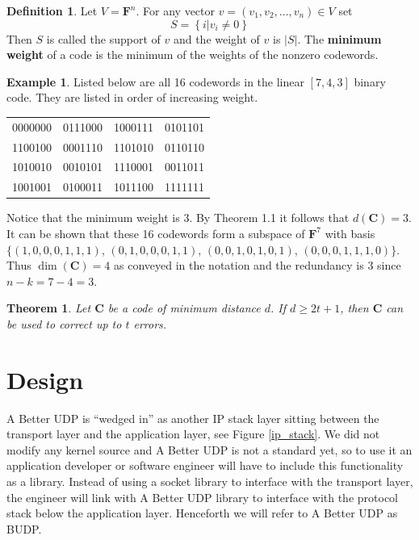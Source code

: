 \documentclass[conference]{IEEEtran}
\newtheorem{theorem}[thm]{Theorem}
\theoremstyle{definition}
\newtheorem{definition}[thm]{Definition}
\newtheorem{example}[thm]{Example}
\begin{document}
\begin{definition}
Let $V=\mathbf{F}^n$.  For any vector $v=(v_1,v_2,\ldots,v_n)\in V$
set
$$
S=\left\{i|v_i\neq 0\right\}
$$
Then $S$ is called the support of $v$ and the weight of $v$ is
$\left|S\right|$.  The {\bf minimum weight} of a code is the
minimum of the weights of the nonzero codewords.
\end{definition}


\begin{example}\label{hamming}
Listed below are all 16 codewords in the linear $[7,4,3]$
binary code.  They are listed in order of increasing weight.\\

\begin{center}
 \begin{tabular}{cccc}
  0000000 & 0111000 & 1000111 & 0101101\\
  1100100 & 0001110 & 1101010 & 0110110\\
  1010010 & 0010101 & 1110001 & 0011011\\
  1001001 & 0100011 & 1011100 & 1111111\\
 \end{tabular}
\end{center}

Notice that the minimum weight is 3.  By Theorem 1.1 it
follows that $d(\mathbf{C}) = 3$.  It can be shown
that these 16 codewords form a subspace of $\mathbf{F}^7$
with basis $\{(1,0,0,0,1,1,1)$, $(0,1,0,0,0,1,1)$, 
$(0,0,1,0,1,0,1)$, $(0,0,0,1,1,1,0)\}$. Thus 
$\dim(\mathbf{C})=4$ as conveyed in the notation and the
redundancy is 3 since $n-k=7-4 = 3$.
\end{example}



\begin{theorem}
Let $\mathbf{C}$ be a code of minimum distance $d$.  If
$d\geq2t+1$, then $\mathbf{C}$ can be used to correct up
to $t$ errors.
\end{theorem}

\vspace{6pt}

\section{Design}
A Better UDP is ``wedged in'' as another IP stack
layer sitting between the transport layer and the application
layer, see Figure \ref{ip_stack}.  We did not modify any
kernel source and A Better UDP is not a standard yet, so
to use it an application developer or software engineer
will have to include this functionality as a library.
Instead of using a socket library to interface
with the transport layer, the engineer will link with
A Better UDP library to interface with the protocol stack
below the application layer. Henceforth we will refer
to A Better UDP as BUDP.
\end{document}
